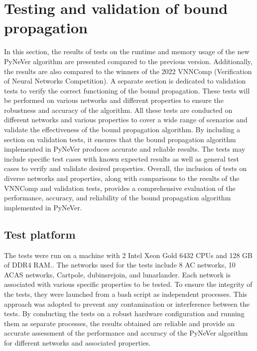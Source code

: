 \section{Testing and validation of bound propagation}

In this section, the results of tests on the runtime and memory usage of the new PyNeVer algorithm are presented compared to the previous version. Additionally, the results are also compared to the winners of the 2022 VNNComp (Verification of Neural Networks Competition).
A separate section is dedicated to validation tests to verify the correct functioning of the bound propagation. These tests will be performed on various networks and different properties to ensure the robustness and accuracy of the algorithm.
All these tests are conducted on different networks and various properties to cover a wide range of scenarios and validate the effectiveness of the bound propagation algorithm.
By including a section on validation tests, it ensures that the bound propagation algorithm implemented in PyNeVer produces accurate and reliable results. The tests may include specific test cases with known expected results as well as general test cases to verify and validate desired properties.
Overall, the inclusion of tests on diverse networks and properties, along with comparisons to the results of the VNNComp and validation tests, provides a comprehensive evaluation of the performance, accuracy, and reliability of the bound propagation algorithm implemented in PyNeVer.

\subsection{Test platform}
The tests were run on a machine with 2 Intel Xeon Gold 6432 CPUs and 128 GB of DDR4 RAM.. The networks used for the tests include 8 AC networks, 10 ACAS networks, Cartpole, dubinsrejoin, and lunarlander. Each network is associated with various specific properties to be tested.
To ensure the integrity of the tests, they were launched from a bash script as independent processes. This approach was adopted to prevent any contamination or interference between the tests.
By conducting the tests on a robust hardware configuration and running them as separate processes, the results obtained are reliable and provide an accurate assessment of the performance and accuracy of the PyNeVer algorithm for different networks and associated properties.

